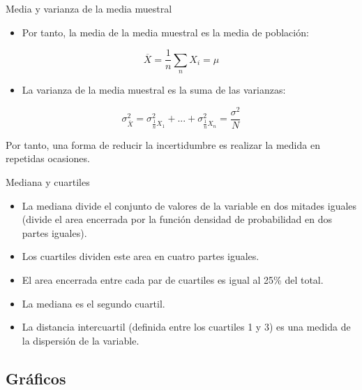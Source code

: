 \documentclass[xcolor={usenames,svgnames,dvipsnames}]{beamer}
\begin{document}
\begin{frame}[label=sec-7-1-8]{Media y varianza de la media muestral}
\begin{itemize}
\item Por tanto, la \alert{media de la media muestral} es la media de población:
\end{itemize}
\[
\overline{X}=\frac{1}{n}\sum_{n}X_{i} = \mu
\]

\begin{itemize}
\item La \alert{varianza de la media muestral} es la suma de las varianzas:
\end{itemize}

\[
\sigma_{\overline{X}}^{2}=\sigma_{\frac{1}{n}X_{1}}^{2}+...+\sigma_{\frac{1}{n}X_{n}}^{2}=\frac{\sigma^2}{N}
\]

Por tanto, una forma de \alert{reducir la incertidumbre} es realizar la
\alert{medida en repetidas ocasiones}.
\end{frame}



\begin{frame}[label=sec-7-1-9]{Mediana y cuartiles}
\begin{itemize}
\item La \alert{mediana} divide el conjunto de valores de la variable en \alert{dos
mitades} iguales (divide el area encerrada por la función densidad
de probabilidad en dos partes iguales).
\item Los \alert{cuartiles} dividen este area en \alert{cuatro} partes iguales.
\item El area encerrada entre cada par de cuartiles es igual al 25\% del total.
\item La \alert{mediana} es el \alert{segundo cuartil}.
\item La \alert{distancia intercuartil} (definida entre los cuartiles 1 y 3) es
una \alert{medida de la dispersión} de la variable.
\end{itemize}
\end{frame}


\subsection{Gráficos}
\label{sec-7-2}
\end{document}
